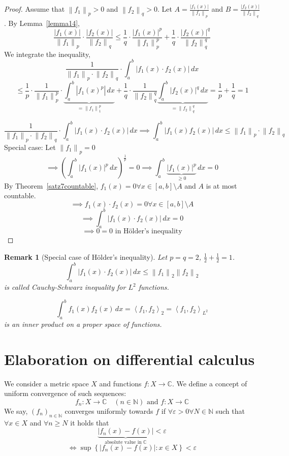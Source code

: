 \documentclass{article}
\newtheorem{remark}{Remark}  \numberwithin{remark}{section}
\newcommand{\set}[1]{\left\{#1\right\}}
\newcommand{\angel}[1]{\left\langle#1\right\rangle}
\newcommand{\norm}[1]{\left\|#1\right\|}
\newcommand{\card}[1]{\left|#1\right|}
\begin{document}
\begin{proof}
  Assume that $\norm{f_1}_p > 0$  and $\norm{f_2}_q > 0$.
  Let $A = \frac{\card{f_1(x)}}{\norm{f_1}_p}$ and $B = \frac{\card{f_2(x)}}{\norm{f_2}_q}$.
  By Lemma~\ref{lemma14},
  \[
    \frac{\card{f_1(x)}}{\norm{f_1}_p} \cdot \frac{\card{f_2(x)}}{\norm{f_2}_q}
    \leq \frac{1}{q} \cdot \frac{\card{f_1(x)}^p}{\norm{f_1}^p_p} + \frac1q \cdot \frac{\card{f_2(x)}^q}{\norm{f_2}_q^q}
  \]
  We integrate the inequality,
  \[
    \frac{1}{\norm{f_1}_p \cdot \norm{f_2}_q} \cdot \int_a^b \card{f_1(x) \cdot f_2(x)} \, dx
  \] \[
    \leq \frac{1}{p} \cdot \frac{1}{\norm{f_1}^p_p} \cdot \underbrace{\int_a^b \card{f_1(x)^p} \, dx}_{= \norm{f_1}_1^p}
    + \frac1q \cdot \frac{1}{\norm{f_2}_q^q} \underbrace{\int_a^b \card{f_2(x)}^q \, dx}_{= \norm{f_2}_q^q}
    = \frac1p + \frac1q = 1
  \]

  \[
    \frac{1}{\norm{f_1}_p \cdot \norm{f_2}_q} \cdot \int_a^b \card{f_1(x) \cdot f_2(x)} \, dx
    \implies \int_a^b \card{f_1(x) f_2(x)} \, dx
    \leq \norm{f_1}_p \cdot \norm{f_2}_q
  \]
  Special case: Let $\norm{f_1}_p = 0$
  \[
    \implies
    \left(\int_a^b \card{f_1(x)}^p \, dx\right)^{\frac1p} = 0
    \implies \int_a^b \underbrace{\card{f_1(x)}^p}_{\geq 0} \, dx = 0
  \]
  By Theorem~\ref{satz7countable}, $f_1(x) = 0 \forall x \in [a,b] \setminus A$
  and $A$ is at most countable.
  \[ \implies f_1(x) \cdot f_2(x) = 0 \forall x \in [a,b] \setminus A \]
  \[ \implies \int_a^b \card{f_1(x) \cdot f_2(x)} \, dx = 0 \]
  \[ \implies 0 = 0 \text{ in H\"older's inequality} \]
\end{proof}

\begin{remark}[Special case of H\"older's inequality]
  Let $p = q = 2$, $\frac12 + \frac12 = 1$.
  \[ \int_a^b \card{f_1(x) \cdot f_2(x)} \, dx \leq \norm{f_1}_2 \norm{f_2}_2 \]
  is called Cauchy-Schwarz inequality for $L^2$ functions.

  \[ \int_a^b f_1(x) f_2(x) \, dx = \angel{f_1,f_2}_2 = \angel{f_1, f_2}_{L^2} \]
  is an inner product on a proper space of functions.
\end{remark}

\section{Elaboration on differential calculus}

We consider a metric space $X$ and functions $f: X \to \mathbb C$.
We define a concept of uniform convergence of such sequences:
\[ f_n: X \to \mathbb C \quad (n \in \mathbb N) \text{ and } f: X \to \mathbb C \]
We say, $(f_n)_{n \in \mathbb N}$ converges uniformly towards $f$ if $\forall \varepsilon > 0 \forall N \in \mathbb N$
such that $\forall x \in X$ and $\forall n \geq N$ it holds that
\[ \underbrace{\card{f_n(x) - f(x)}}_{\text{absolute value in } \mathbb C} < \varepsilon \]
\[ \iff \sup\set{\card{f_n(x) - f(x)}: x \in X} < \varepsilon \]
\end{document}
